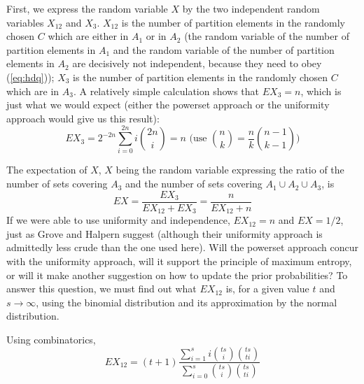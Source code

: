 \documentclass[12pt]{article}
\begin{document}
First, we express the random variable $X$ by the two independent
random variables $X_{12}$ and $X_{3}$. $X_{12}$ is the number of
partition elements in the randomly chosen $C$ which are either in
$A_{1}$ or in $A_{2}$ (the random variable of the number of partition
elements in $A_{1}$ and the random variable of the number of partition
elements in $A_{2}$ are decisively not independent, because they need
to obey ({\ref{eq:hdq}})); $X_{3}$ is the number of partition elements
in the randomly chosen $C$ which are in $A_{3}$. A relatively simple
calculation shows that $EX_{3}=n$, which is just what we would expect
(either the powerset approach or the uniformity approach would give us
this result):
\begin{displaymath}
  EX_{3}=2^{-2n}\sum_{i=0}^{2n}i\binom{2n}{i}=n\mbox{ (use }\binom{n}{k}=\frac{n}{k}\binom{n-1}{k-1}\mbox{)}
\end{displaymath}

The expectation of $X$, $X$ being the random variable expressing the
ratio of the number of sets covering $A_{3}$ and the number of sets
covering $A_{1}\cup{}A_{2}\cup{}A_{3}$, is
\begin{displaymath}
  EX=\frac{EX_{3}}{EX_{12}+EX_{3}}=\frac{n}{EX_{12}+n}
\end{displaymath}
If we were able to use uniformity and independence, $EX_{12}=n$ and
$EX=1/2$, just as Grove and Halpern suggest (although their uniformity
approach is admittedly less crude than the one used here). Will the
powerset approach concur with the uniformity approach, will it support
the principle of maximum entropy, or will it make another suggestion
on how to update the prior probabilities? To answer this question, we
must find out what $EX_{12}$ is, for a given value $t$ and
$s\rightarrow\infty$, using the binomial distribution and its
approximation by the normal distribution.

Using combinatorics,
\begin{displaymath}
  EX_{12}=(t+1)\frac{\sum_{i=1}^{s}i\binom{ts}{i}\binom{ts}{ti}}{\sum_{i=0}^{s}\binom{ts}{i}\binom{ts}{ti}}
\end{displaymath}
\end{document}
